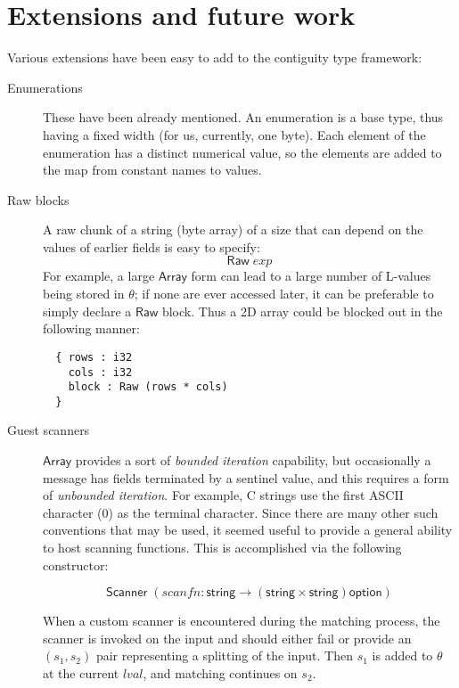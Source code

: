 \documentclass[svgnames]{llncs}
\newcommand{\konst}[1]{\ensuremath{\mathsf{#1}}}
\newcommand{\lval}{\ensuremath{\mathit{lval}}}
\begin{document}
\section{Extensions and future work}

Various extensions have been easy to add to the contiguity type
framework:

\begin{description}

\item [Enumerations] These have been already mentioned. An enumeration
  is a base type, thus having a fixed width (for us, currently, one
  byte). Each element of the enumeration has a distinct numerical
  value, so the elements are added to the map from constant names to values.

\item [Raw blocks] A raw chunk of a string (byte array) of a size that
  can depend on the values of earlier fields is easy to specify:
  \[ \konst{Raw}\; \mathit{exp} \]
For example, a large \konst{Array} form can lead to a large number of
L-values being stored in $\theta$; if none are ever accessed later, it
can be preferable to simply declare a \konst{Raw} block. Thus a 2D
array could be blocked out in the following manner:

\begin{verbatim}
  { rows : i32
    cols : i32
    block : Raw (rows * cols)
  }
\end{verbatim}

\item [Guest scanners] \konst{Array} provides a sort of \emph{bounded
  iteration} capability, but occasionally a message has fields
  terminated by a sentinel value, and this requires a form of
  \emph{unbounded iteration}. For example, C strings use the first
  ASCII character (0) as the terminal character. Since there are many
  other such conventions that may be used, it seemed useful to provide
  a general ability to host scanning functions. This is accomplished via the following constructor:

  \[ \konst{Scanner}\;
     (\mathit{scanfn} : \konst{string} \to (\konst{string} \times \konst{string})\konst{option}) \]

  When a custom scanner is encountered during the matching process,
  the scanner is invoked on the input and should either fail or
  provide an $(s_1,s_2)$ pair representing a splitting of the
  input. Then $s_1$ is added to $\theta$ at the current \lval, and
  matching continues on $s_2$.


\end{description}
\end{document}
